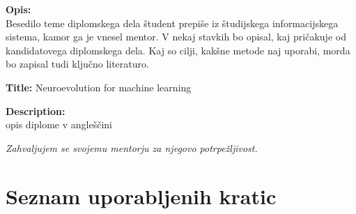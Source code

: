 \documentclass[a4paper,12pt,openright]{book}
\newcommand{\clearemptydoublepage}{\newpage{\pagestyle{empty}\cleardoublepage}}
\begin{document}
    \bigskip
    \noindent\textbf{Opis:}\\
    Besedilo teme diplomskega dela študent prepiše iz študijskega informacijskega sistema, kamor ga je vnesel mentor.
    V nekaj stavkih bo opisal, kaj pričakuje od kandidatovega diplomskega dela.
    Kaj so cilji, kakšne metode naj uporabi, morda bo zapisal tudi ključno literaturo.

    \bigskip
    \noindent\textbf{Title:} Neuroevolution for machine learning

    \bigskip
    \noindent\textbf{Description:}\\
    opis diplome v angleščini

    \vfill



    \vspace{2cm}

    \clearemptydoublepage

    \thispagestyle{empty}\mbox{}\vfill\null\it%
    \noindent
    Zahvaljujem se svojemu mentorju za njegovo potrpežljivost.
    \rm\normalfont

    \clearemptydoublepage


    \clearemptydoublepage


    \pagestyle{empty}
    \def\thepage{}%
    \tableofcontents{}


    \clearemptydoublepage


    \chapter*{Seznam uporabljenih kratic}
\end{document}
